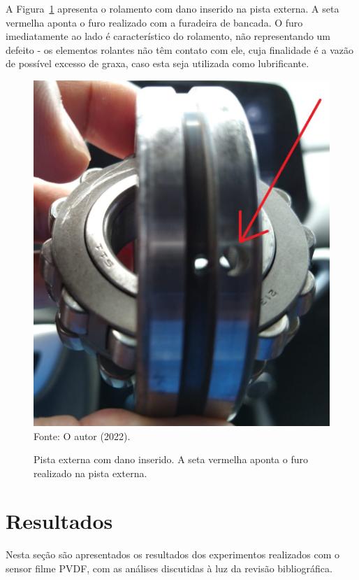 \documentclass[
	12pt,				
	oneside,			
	a4paper,			
	english,			
	brazil,			
	]{abntex2ppgsi}
\begin{document}
A Figura~\ref{dano_pista_externa} apresenta o rolamento com dano inserido na pista externa. A seta vermelha aponta o furo realizado com a furadeira de bancada. O furo imediatamente ao lado é característico do rolamento, não representando um defeito - os elementos rolantes não têm contato com ele, cuja finalidade é a vazão de possível excesso de graxa, caso esta seja utilizada como lubrificante.

\begin{figure}[H]
\centering
\caption {Pista externa com dano inserido. A seta vermelha aponta o furo realizado na pista externa.}
\includegraphics[width=\textwidth,keepaspectratio]{dano_pista_externa} \\
Fonte: O autor (2022).
\label{dano_pista_externa}
\end{figure}

\chapter{Resultados}

Nesta seção são apresentados os resultados dos experimentos realizados com o sensor filme PVDF, com as análises discutidas à luz da revisão bibliográfica. 
\end{document}
